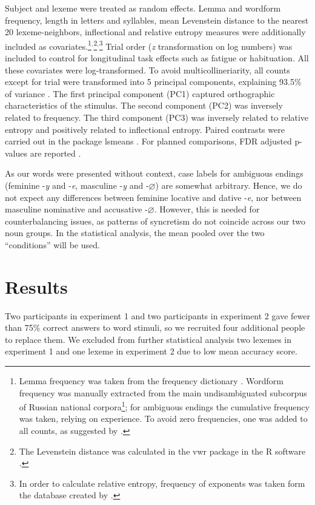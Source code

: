 \documentclass[output=paper, modfonts,newtxmath,hidelinks]{langscibook}
\begin{document}
Subject and lexeme were treated as random effects. Lemma and wordform frequency, length in letters and syllables, mean Levenstein distance to the nearest 20 lexeme-neighbors, 
inflectional and relative entropy measures were additionally included as covariates.\footnote{Lemma frequency was taken from the frequency dictionary \citep{lyashevskaya2009frequency}. Wordform frequency was manually extracted from the main undisambiguated subcorpus of Russian national corpora\footnote{\url{http://ruscorpora.ru}}; for ambiguous endings the cumulative frequency was taken,  relying on  experience. To avoid zero frequencies, one was added to all counts, as suggested by \citet*{brysbaert2013dealing}.}$^,$\footnote{The Levenstein distance was calculated in the vwr package \citep{keuleers2013vwr} in the R software \citep{team2014r}.}$^,$\footnote{In order to calculate relative entropy, frequency of exponents was taken form the database created by \citet*{samojlova2014frequencies}.} Trial order (\textit{z} transformation on log numbers) was included to control for longitudinal task effects such as fatigue or habituation. All these covariates were log-transformed. To avoid multicollineriarity, all counts except for trial were transformed into 5 principal components, explaining 93.5\% of variance \citep{baayen2008analyzing}. The first principal component (PC1) captured orthographic characteristics of the stimulus. The second component (PC2) was inversely related to frequency. The third component (PC3) was inversely related to relative entropy and positively related to inflectional entropy. Paired contrasts were carried out in the package lsmeans \citep{lenth2016least}. For planned comparisons, FDR adjusted p-values are reported \citep{benjamini1995controlling}. 

As our words were presented without context, case labels for ambiguous endings (feminine -\textit{y} and -\textit{e}, masculine -\textit{y} and -\textit{$\varnothing$}) are somewhat arbitrary. Hence, we do not expect any differences between feminine locative and dative -\textit{e}, nor between masculine nominative and accusative -\textit{$\varnothing$}. However, this is needed for counterbalancing issues, as patterns of syncretism do not coincide across our two noun groups. In the statistical analysis, the mean pooled over the two ``conditions'' will be used.

\section{Results}
Two participants in experiment 1 and two participants in experiment 2 gave fewer than 75\% correct answers to word stimuli, so we recruited four additional people to replace them. We excluded from further  statistical analysis two lexemes in experiment 1 and one lexeme in experiment 2 due to low mean accuracy score.
\end{document}
